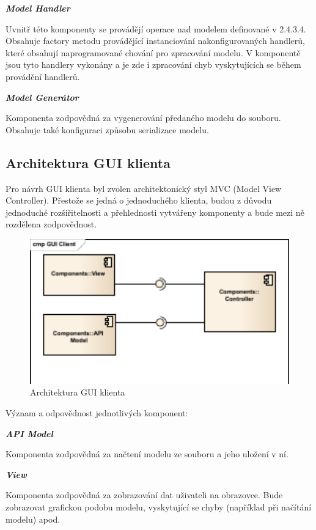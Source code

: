 \documentclass[11pt,twoside,a4paper]{book}
\begin{document}
\textbf{\textit{Model Handler}}

Uvnitř této komponenty se provádějí operace nad modelem definované v 2.4.3.4. Obsahuje
factory metodu provádějící instanciování nakonfigurovaných handlerů, které obsahují
naprogramované chování pro zpracování modelu. V komponentě jsou tyto handlery vykonány
a je zde i zpracování chyb vyskytujících se během provádění handlerů.

\textbf{\textit{Model Generátor}}

Komponenta zodpovědná za vygenerování předaného modelu do souboru. Obsahuje také
konfiguraci způsobu serializace modelu.

\subsection{Architektura GUI klienta}

Pro návrh GUI klienta byl zvolen architektonický styl MVC (Model View Controller).
Přestože se jedná o jednoduchého klienta, budou z důvodu jednoduché rozšiřitelnosti a
přehlednosti vytvářeny komponenty a bude mezi ně rozdělena zodpovědnost.

\begin{figure}[h]
\begin{center}
\includegraphics[width=13cm]{images-pdf/GUI-Client.pdf}
\caption{Architektura GUI klienta}
\label{fig:logo}
\end{center}
\end{figure}

Význam a odpovědnost jednotlivých komponent:

\textbf{\textit{API Model}}

Komponenta zodpovědná za načtení modelu ze souboru a jeho uložení v ní.

\textbf{\textit{View}}

Komponenta zodpovědná za zobrazování dat uživateli na obrazovce. Bude zobrazovat
grafickou podobu modelu, vyskytující se chyby (například při načítání modelu) apod.
\end{document}
